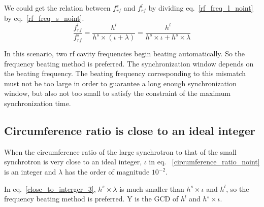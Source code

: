 We could get the relation between $f_{rf}^{s}$ and $f_{rf}^{l}$ by dividing eq.~\ref{rf_freq_l_noint} by eq.~\ref{rf_freq_s_noint}.
\begin{equation} 
\frac{f_{rf}^{l}}{f_{rf}^{s}}=\frac{h^l}{h^s \times (\iota+ \lambda)}=\frac{h^l}{h^s \times \iota+ h^s \times \lambda}\label{close_to_interger_3}
\end{equation}

In this scenario, two rf cavity frequencies begin beating automatically. So the frequency beating method is preferred. The synchronization window depends on the beating frequency. The beating frequency corresponding to this mismatch must not be too large in order to guarantee a long enough synchronization window, but also not too small to satisfy the constraint of the maximum synchronization time.
\subsection{Circumference ratio is close to an ideal integer}
When the circumference ratio of the large synchrotron to that of the small synchrotron is very close to an ideal integer, $\iota$ in eq. ~\ref{circumference_ratio_noint} is an integer and $\lambda$ has the order of magnitude $10^{-2}$.


In eq.~\ref{close_to_interger_3}, $h^s\times\lambda $ is much smaller than $h^s \times \iota$ and $h^l$, so the frequency beating method is preferred. Y is the GCD of $h^l$ and $h^s \times \iota$.




